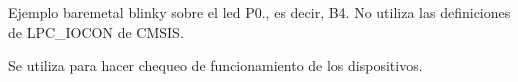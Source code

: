 Ejemplo baremetal blinky sobre el led P0., es decir, B4. No utiliza las definiciones de L\+P\+C\+\_\+\+I\+O\+C\+ON de C\+M\+S\+IS.

Se utiliza para hacer chequeo de funcionamiento de los dispositivos. 
